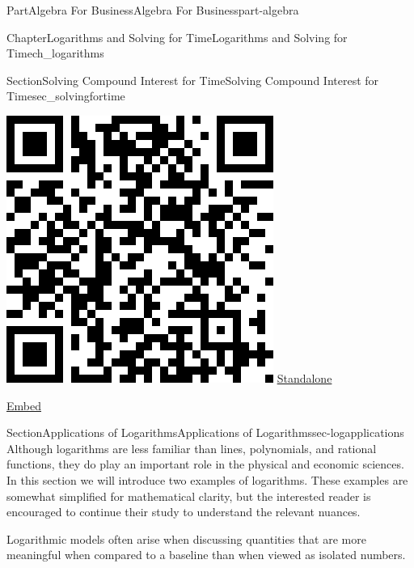 \documentclass[oneside,10pt,]{tufte-book}
\numberwithin{equation}{chapter}
\begin{document}
\begin{partptx}{Part}{Algebra For Business}{}{Algebra For Business}{}{}{part-algebra}
\begin{chapterptx}{Chapter}{Logarithms and Solving for Time}{}{Logarithms and Solving for Time}{}{}{ch_logarithms}
\begin{sectionptx}{Section}{Solving Compound Interest for Time}{}{Solving Compound Interest for Time}{}{}{sec_solvingfortime}
\begin{sidebyside}{2}{0.075}{0.075}{0.17}
\begin{sbspanel}{0.21}
\includegraphics[width=\linewidth]{generated/qrcode/interactive_depreciation.png}
\href{http://webwork.bridgew.edu/oer/functions_at_work/interactive_depreciation.html}{Standalone}%
\par
\href{http://webwork.bridgew.edu/oer/functions_at_work/interactive_depreciation-if.html}{Embed}%
\end{sbspanel}%
\end{sidebyside}%
\end{sectionptx}
%
%
\typeout{************************************************}
\typeout{************************************************}
%
\begin{sectionptx}{Section}{Applications of Logarithms}{}{Applications of Logarithms}{}{}{sec-logapplications}
Although logarithms are less familiar than lines, polynomials, and rational functions, they do play an important role in the physical and economic sciences.  In this section we will introduce two examples of logarithms. These examples are somewhat simplified for mathematical clarity, but the interested reader is encouraged to continue their study to understand the relevant nuances.%
\par
Logarithmic models often arise when discussing quantities that are more meaningful when compared to a baseline than when viewed as isolated numbers.%

\end{sectionptx}
\end{chapterptx}
\end{partptx}
\end{document}
